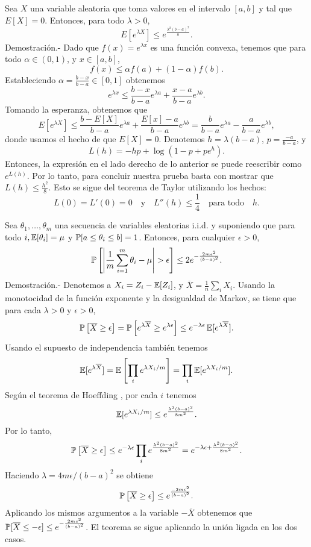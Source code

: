 \begin{teo}
Sea $ X $ una variable aleatoria que toma valores en el intervalo $ [a, b] $ y tal que $ E[X] = 0 $. Entonces, para todo $ \lambda > 0 $,
$$
E[e^{\lambda X}] \leq e^{\frac{\lambda^2 (b-a)^2}{8}}.
$$
Demostración.-\; Dado que $ f(x) = e^{\lambda x} $ es una función convexa, tenemos que para todo $ \alpha \in (0, 1) $, y $ x \in [a, b] $,
$$
f(x) \leq \alpha f(a) + (1 - \alpha) f(b).
$$
Estableciendo $ \alpha = \frac{b-x}{b-a} \in [0, 1] $ obtenemos
$$
e^{\lambda x} \leq \frac{b - x}{b - a} e^{\lambda a} + \frac{x - a}{b - a} e^{\lambda b}.
$$
Tomando la esperanza, obtenemos que
$$
E[e^{\lambda X}] \leq \frac{b - E[X]}{b - a} e^{\lambda a} + \frac{E[x] - a}{b - a} e^{\lambda b} = \frac{b}{b - a} e^{\lambda a} - \frac{a}{b - a} e^{\lambda b},
$$
donde usamos el hecho de que $ E[X] = 0 $. Denotemos $ h = \lambda (b - a) $, $ p = \frac{-a}{b-a} $, y
$$
L(h) = -hp + \log(1 - p + pe^{h}).
$$
Entonces, la expresión en el lado derecho de lo anterior se puede reescribir como $ e^{L(h)} $. Por lo tanto, para concluir nuestra prueba basta con mostrar que $ L(h) \leq \frac{h^2}{8} $. Esto se sigue del teorema de Taylor utilizando los hechos:
$$
L(0) = L'(0) = 0 \quad \text{y} \quad L''(h) \leq \frac{1}{4} \quad \text{para todo} \quad h.
$$
\end{teo}

\begin{lema}
    Sea $\theta_1,\ldots, \theta_m$ una secuencia de variables eleatorias i.i.d. y suponiendo que para todo $i, \E[\theta_i]=\mu$ y $\P[a\leq \theta_i\leq b] = 1$. Entonces, para cualquier $\epsilon > 0$,
    $$\P\left[\left|\frac{1}{m}\sum_{i=1}^m \theta_i - \mu\right| > \epsilon\right] \leq 2 e^{-\frac{2m\epsilon^2}{(b-a)^2}}.$$
    Demostración.-\: Denotemos a $X_i=Z_i-\E[Z_i]$, y $\overline{X}=\frac{1}{n} \sum_i X_i$. Usando la monotocidad de la función exponente y la desigualdad de Markov, se tiene que para cada $\lambda > 0$ y $\epsilon>0$,
    $$\P\left[\overline{X}\geq \epsilon\right] = \P\left[e^{\lambda \overline{X}}\geq e^{\lambda \epsilon}\right] \leq e^{-\lambda \epsilon} \E[e^{\lambda \overline{X}}].$$
    Usando el supuesto de independencia también tenemos
    $$\E[e^{\lambda \overline{X}}] = \E\left[\prod_i e^{\lambda X_i/m}\right] = \prod_i \E[e^{\lambda X_i/m}].$$
    Según el teorema de Hoeffding , por cada $i$ tenemos
    $$\E[e^{\lambda X_i/m}] \leq e^{\frac{\lambda^2(b-a)^2}{8m^2}}.$$
    Por lo tanto,
    $$\P\left[\overline{X}\geq \epsilon\right] \leq e^{-\lambda \epsilon} \prod_i e^{\frac{\lambda^2(b-a)^2}{8m^2}} = e^{-\lambda \epsilon + \frac{\lambda^2(b-a)^2}{8m^2}}.$$
    Haciendo $\lambda = 4m\epsilon/(b-a)^2$ se obtiene
    $$\P\left[\overline{X}\geq \epsilon\right] \leq e^{\frac{-2m\epsilon^2}{(b-a)^2}}.$$
    Aplicando los mismos argumentos a la variable $-\overline{X}$ obtenemos que $\P[\overline{X}\leq -\epsilon] \leq e^{-\frac{2ms^2}{(b-a)^2}}$. El teorema se sigue aplicando la unión ligada en los dos casos.
\end{lema}


